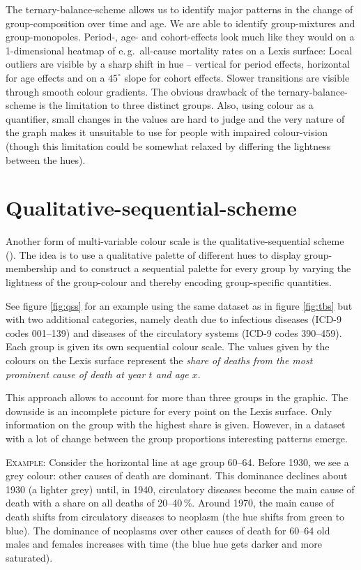 \documentclass[a4paper]{scrartcl}
\begin{document}
The ternary-balance-scheme allows us to identify major patterns in the change of group-composition over time and age. We are able to identify group-mixtures and group-monopoles. Period-, age- and cohort-effects look much like they would on a 1-dimensional heatmap of e.\,g.~all-cause mortality rates on a Lexis surface: Local outliers are visible by a sharp shift in hue -- vertical for period effects, horizontal for age effects and on a $45^{\circ}$ slope for cohort effects. Slower transitions are visible through smooth colour gradients.
The obvious drawback of the ternary-balance-scheme is the limitation to three distinct groups. Also, using colour as a quantifier, small changes in the values are hard to judge and the very nature of the graph makes it unsuitable to use for people with impaired colour-vision (though this limitation could be somewhat relaxed by differing the lightness between the hues).

\section*{Qualitative-sequential-scheme}

Another form of multi-variable colour scale is the qualitative-sequential scheme (\cite{Brewer1994a}). The idea is to use a qualitative palette of different hues to display group-membership and to construct a sequential palette for every group by varying the lightness of the group-colour and thereby encoding group-specific quantities.

See figure \ref{fig:qss} for an example using the same dataset as in figure \ref{fig:tbs} but with two additional categories, namely death due to infectious diseases (ICD-9 codes 001--139) and diseases of the circulatory systems (ICD-9 codes 390--459). Each group is given its own sequential colour scale. The values given by the colours on the Lexis surface represent the \emph{share of deaths from the most prominent cause of death at year $t$ and age $x$}.

This approach allows to account for more than three groups in the graphic. The downside is an incomplete picture for every point on the Lexis surface. Only information on the group with the highest share is given. However, in a dataset with a lot of change between the group proportions interesting patterns emerge.

\textsc{Example:} Consider the horizontal line at age group 60--64. Before 1930, we see a grey colour: other causes of death are dominant. This dominance declines about 1930 (a lighter grey) until, in 1940, circulatory diseases become the main cause of death with a share on all deaths of 20--40\,\%. Around 1970, the main cause of death shifts from circulatory diseases to neoplasm (the hue shifts from green to blue). The dominance of neoplasms over other causes of death for 60--64 old males and females increases with time (the blue hue gets darker and more saturated).
\end{document}

